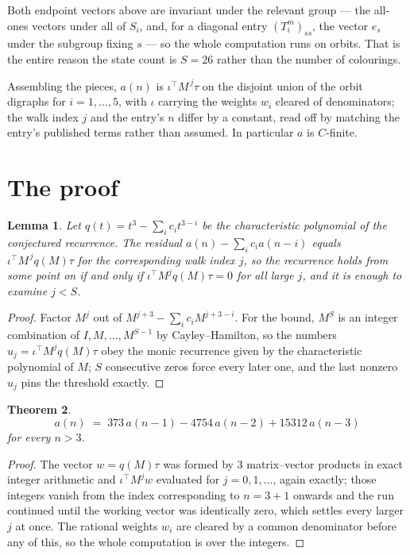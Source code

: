 \documentclass[11pt,a4paper]{article}
\theoremstyle{plain}
\newtheorem{theorem}{Theorem}
\newtheorem{lemma}[theorem]{Lemma}
\theoremstyle{definition}
\begin{document}
Both endpoint vectors above are invariant under the relevant group --- the all-ones vectors
under all of $S_i$, and, for a diagonal entry $(T_i^m)_{ss}$, the vector $e_s$ under the
subgroup fixing $s$ --- so the whole computation runs on orbits. That is the entire reason the
state count is $S=26$ rather than the number of colourings.

Assembling the pieces, $a(n)$ is $\iota^{\!\top}M^{\,j}\tau$ on the disjoint union of the
orbit digraphs for $i=1,\dots,5$, with $\iota$ carrying the weights $w_i$ cleared of
denominators; the walk index $j$ and the entry's $n$ differ by a constant, read off by
matching the entry's published terms rather than assumed. In particular $a$ is $C$-finite.

\section{The proof}

\begin{lemma}\label{lem:crit}
Let $q(t)=t^{3}-\sum_i c_it^{3-i}$ be the characteristic polynomial of the
conjectured recurrence. The residual $a(n)-\sum_ic_ia(n-i)$ equals
$\iota^{\!\top}M^{\,j}q(M)\tau$ for the corresponding walk index $j$, so the recurrence
holds from some point on if and only if $\iota^{\!\top}M^{j}q(M)\tau=0$ for all large $j$,
and it is enough to examine $j<S$.
\end{lemma}

\begin{proof}
Factor $M^{j}$ out of $M^{j+3}-\sum_ic_iM^{j+3-i}$. For the bound, $M^{S}$
is an integer combination of $I,M,\dots,M^{S-1}$ by Cayley--Hamilton, so the numbers
$u_j=\iota^{\!\top}M^{j}q(M)\tau$ obey the monic recurrence given by the characteristic
polynomial of $M$; $S$ consecutive zeros force every later one, and the last nonzero $u_j$
pins the threshold exactly.
\end{proof}

\begin{theorem}
\[
a(n)\;=\;373\,a(n-1) - 4754\,a(n-2) + 15312\,a(n-3)
\]
for every $n>3$.
\end{theorem}

\begin{proof}
The vector $w=q(M)\tau$ was formed by $3$ matrix--vector products in exact integer
arithmetic and $\iota^{\!\top}M^{j}w$ evaluated for $j=0,1,\dots$, again exactly; those
integers vanish from the index corresponding to $n=3+1$ onwards and the run continued
until the working vector was identically zero, which settles every larger $j$ at once. The
rational weights $w_i$ are cleared by a common denominator before any of this, so the whole
computation is over the integers.
\end{proof}
\end{document}
